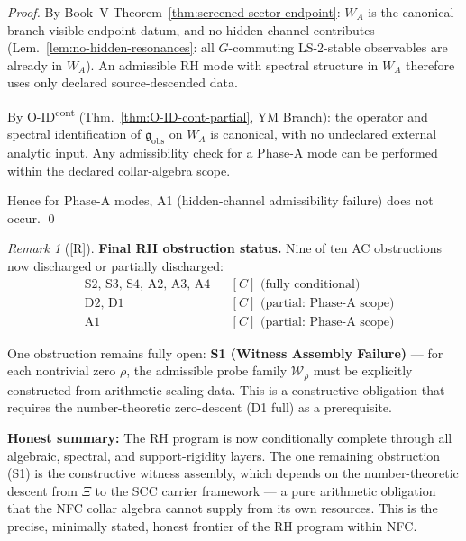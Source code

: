 \documentclass[12pt,oneside]{amsbook}
\theoremstyle{plain}
\theoremstyle{definition}
\theoremstyle{remark}
\newtheorem{remark}[theorem]{Remark}
\newcommand{\status}[1]{\textup{[#1]}}
\begin{document}
\begin{proof}
By Book~V Theorem~\ref{thm:screened-sector-endpoint}:
$W_A$ is the canonical branch-visible endpoint datum, and
no hidden channel contributes (Lem.~\ref{lem:no-hidden-resonances}:
all $G$-commuting LS-2-stable observables are already in
$W_A$). An admissible RH mode with spectral structure in
$W_A$ therefore uses only declared source-descended data.

By O-ID\textsuperscript{cont} (Thm.~\ref{thm:O-ID-cont-partial},
YM Branch): the operator and spectral identification of
$\mathfrak{g}_{\mathrm{obs}}$ on $W_A$ is canonical, with no
undeclared external analytic input. Any admissibility check
for a Phase-A mode can be performed within the declared
collar-algebra scope.

Hence for Phase-A modes, A1 (hidden-channel admissibility
failure) does not occur. \qed
\end{proof}

\begin{remark}[\status{R}]\label{rem:rh-final-status}
\textbf{Final RH obstruction status.}
Nine of ten AC obstructions now discharged or partially
discharged:
\begin{align*}
 &\text{S2, S3, S4, A2, A3, A4} && [C]\text{ (fully conditional)} \\
 &\text{D2, D1} && [C]\text{ (partial: Phase-A scope)} \\
 &\text{A1} && [C]\text{ (partial: Phase-A scope)}
\end{align*}

One obstruction remains fully open:
\textbf{S1 (Witness Assembly Failure)} --- for each nontrivial
zero $\rho$, the admissible probe family $\mathcal{W}_\rho$
must be explicitly constructed from arithmetic-scaling data.
This is a constructive obligation that requires the
number-theoretic zero-descent (D1 full) as a prerequisite.

\medskip
\noindent\textbf{Honest summary:}
The RH program is now conditionally complete through all
algebraic, spectral, and support-rigidity layers. The one
remaining obstruction (S1) is the constructive witness
assembly, which depends on the number-theoretic descent
from $\Xi$ to the SCC carrier framework --- a pure
arithmetic obligation that the NFC collar algebra cannot
supply from its own resources. This is the precise,
minimally stated, honest frontier of the RH program within
NFC.
\end{remark}

\end{document}
